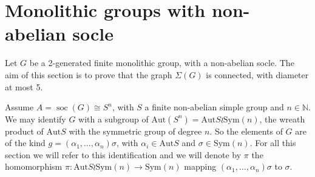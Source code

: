 \documentclass{amsart}
\DeclareMathOperator{\soc}{soc}
\newcommand{\sym}{\mathrm{Sym}}
\newcommand{\Aut}{\mathrm{Aut}}
\numberwithin{equation}{section}
\begin{document}
\section{Monolithic groups with non-abelian socle}\label{secunso}
Let $G$ be a 2-generated finite monolithic group, with a non-abelian socle. The aim of this section is to prove that the graph $\Sigma(G)$ is connected, with diameter at most 5.

Assume $A=\soc(G)\cong S^n$, with $S$ a finite non-abelian simple group and $n\in \mathbb N.$
We may identify $G$ with a subgroup of $\Aut(S^n)=\Aut S \wr \sym (n)$, the wreath product of $\Aut
S$ with the symmetric group of degree $n$. So the elements of $G$ are of the
kind $g=(\alpha_1, \dots, \alpha_n)\sigma$, with $\alpha_i \in \Aut S$ and $
\sigma \in \sym(n)$.
For all this section we will refer to this identification and we will denote by $\pi$ the homomorphism $\pi: \Aut S \wr \sym (n) \to \sym (n)$ mapping
$(\alpha_1, \dots, \alpha_n)\sigma$ to $\sigma$.
\end{document}
